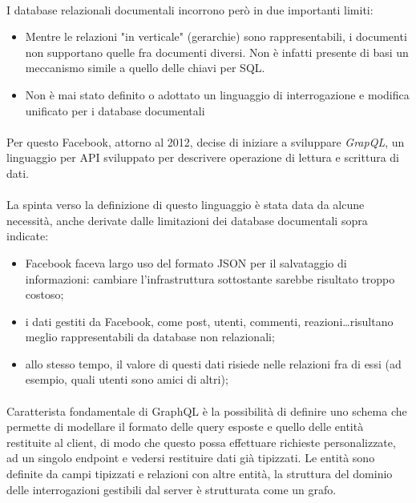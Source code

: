 \documentclass[a4paper, 12pt]{report}
\begin{document}
    \paragraph*{}
      I database relazionali documentali incorrono però in due importanti limiti:
      \begin{itemize}
        \item Mentre le relazioni "in verticale" (gerarchie) sono rappresentabili, i documenti non supportano quelle fra documenti diversi. Non è infatti presente di basi un meccanismo simile a quello delle chiavi per SQL.
        \item Non è mai stato definito o adottato un linguaggio di interrogazione e modifica unificato per i database documentali 
      \end{itemize}
    \paragraph*{}
      Per questo Facebook, attorno al 2012, decise di iniziare a sviluppare \emph{GrapQL}, un linguaggio per API sviluppato per descrivere operazione di lettura e scrittura di dati.
    \paragraph*{}
      La spinta verso la definizione di questo linguaggio è stata data da alcune necessità, anche derivate dalle limitazioni dei database documentali sopra indicate:
      \begin{itemize}
        \item Facebook faceva largo uso del formato JSON per il salvataggio di informazioni: cambiare l'infrastruttura sottostante sarebbe risultato troppo costoso;
        \item i dati gestiti da Facebook, come post, utenti, commenti, reazioni\dots risultano meglio rappresentabili da database non relazionali;
        \item allo stesso tempo, il valore di questi dati risiede nelle relazioni fra di essi (ad esempio, quali utenti sono amici di altri);
      \end{itemize}
    \paragraph*{}
      Caratterista fondamentale di GraphQL è la possibilità di definire uno schema che permette di modellare il formato delle query esposte e quello delle entità restituite al client, di modo che questo possa effettuare richieste personalizzate, ad un singolo endpoint e vedersi restituire dati già tipizzati.
      Le entità sono definite da campi tipizzati e relazioni con altre entità, la struttura del dominio delle interrogazioni gestibili dal server è strutturata come un grafo.
\end{document}
